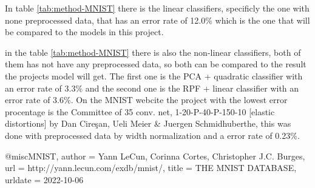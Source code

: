 In table \ref{tab:method-MNIST} there is the linear classifiers, specificly the one with none preprocessed data, that has an error rate of 12.0\% which is the one that will be compared to the models in this project. 

in the table \ref{tab:method-MNIST} there is also the non-linear classifiers, both of them has not have any preprocessed data, so both can be compared to the result the projects model will get. The first one is the PCA + quadratic classifier with an error rate of 3.3\% and the second one is the RPF + linear classifier with an error rate of 3.6\%. 
On the MNIST webcite \cite{MNIST} the project with the lowest error procentage is the Committee of 35 conv. net, 1-20-P-40-P-150-10 [elastic distortions] by Dan Cireşan, Ueli Meier & Juergen Schmidhuberthe, this was done with preprocessed data by width normalization and a error rate of 0.23\%.








@misc{MNIST,
  author = {Yann LeCun, Corinna Cortes, Christopher J.C. Burges},
  url          = {http://yann.lecun.com/exdb/mnist/},
  title        = {THE MNIST DATABASE},
  urldate      = {2022-10-06}
}
